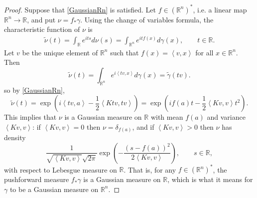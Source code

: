 \documentclass{article}
\newcommand{\inner}[2]{\left\langle #1, #2 \right\rangle}
\theoremstyle{definition}
\begin{document}
\begin{proof}
Suppose  that
\eqref{GaussianRn} is satisfied.
Let $f \in (\mathbb{R}^n)^*$, i.e. a linear map $\mathbb{R}^n \to \mathbb{R}$, and put $\nu = f_* \gamma$. Using the change of variables formula,
the characteristic function of $\nu$ is
\begin{align*}
\widetilde{\nu}(t) = \int_{\mathbb{R}} e^{it s} d\nu(s) = 
\int_{\mathbb{R}^n} e^{it f(x)} d\gamma(x), \qquad t \in \mathbb{R}.
\end{align*}
Let $v$ be the unique element of $\mathbb{R}^n$ such that
$f(x) = \inner{v}{x}$ for all $x \in \mathbb{R}^n$. Then
\[
\widetilde{\nu}(t) = \int_{\mathbb{R}^n} e^{i \inner{tv}{x}} d\gamma(x) = 
\widetilde{\gamma}(tv).
\]
so by  \eqref{GaussianRn},
\[
\widetilde{\nu}(t) = \exp\left( i \inner{tv}{a} - \frac{1}{2} \inner{Ktv}{tv} \right)
=\exp\left(i f(a) t  - \frac{1}{2}  \inner{Kv}{v} t^2 \right).
\]
This implies that $\nu$ is a Gaussian measure on $\mathbb{R}$ with mean $f(a)$ and variance
$\inner{Kv}{v}$: if $\inner{Kv}{v}=0$ then 
$\nu=\delta_{f(a)}$, and if $\inner{Kv}{v}>0$ then $\nu$ has density
\[
\frac{1}{\sqrt{\inner{Kv}{v}} \sqrt{2\pi}} \exp\left(-\frac{(s-f(a))^2}{2 \inner{Kv}{v}} \right), \qquad
s \in \mathbb{R},
\]
with respect to Lebesgue measure on $\mathbb{R}$. That is, for any
$f \in (\mathbb{R}^n)^*$, the pushforward measure $f_* \gamma$ is a Gaussian measure
on $\mathbb{R}$, which is what it means for $\gamma$ to be a Gaussian measure on $\mathbb{R}^n$. 


\end{proof}
\end{document}
